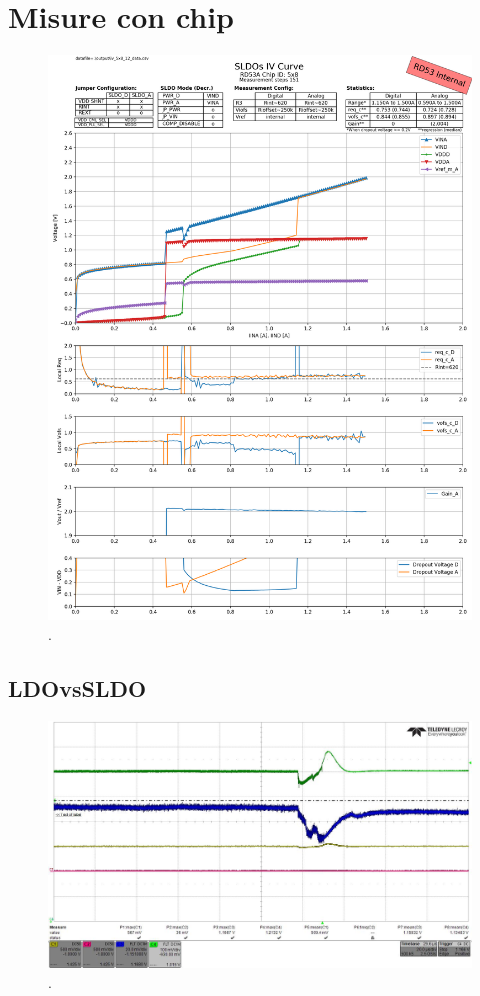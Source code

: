 \section{Misure con chip}
\begin{figure}
\centering
\includegraphics[scale=.3]{Immagini/iv_5x8_12_plt_01}
\caption{.}
\label{iv_5x8_12_plt_01}
\end{figure}



\subsection{LDOvsSLDO}

\begin{figure}
\centering
\includegraphics[scale=.3]{Immagini/alllin1}
\caption{.}
\label{alllin1}
\end{figure}


